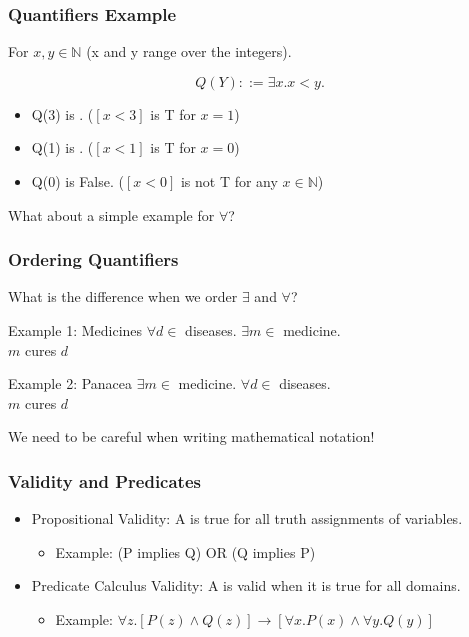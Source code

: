 \documentclass{beamer}
\begin{document}
\begin{frame}
  \frametitle{Quantifiers Example}

  For $x,y \in \mathbb{N}$ (x and y range over the integers).

  \begin{equation*}
    Q(Y) ::= \exists x. x < y.
  \end{equation*}

  \begin{itemize}
  \item Q(3) is . ($[x < 3]$ is T for $x = 1$)
  \item Q(1) is . ($[x < 1]$ is T for $x = 0$)
  \item Q(0) is \alert{False}. ($[x < 0]$ is not T for any $x\in\mathbb{N}$)
  \end{itemize}

  \bigskip

  What about a simple example for $\forall$?
\end{frame}

\begin{frame}
  \frametitle{Ordering Quantifiers}
  What is the difference when we order $\exists$ and $\forall$?

  \bigskip
  
  \begin{block}{Example 1: Medicines}
    $\forall d \in$ diseases. $\exists m \in$ medicine.\\
    $m$ cures $d$
  \end{block}

  \begin{block}{Example 2: Panacea}
    $\exists m \in$ medicine. $\forall d \in$ diseases.\\
    $m$ cures $d$
  \end{block}

  We need to be careful when writing mathematical notation!
  
\end{frame}

\begin{frame}
  \frametitle{Validity and Predicates}
  \begin{itemize}
  \item Propositional Validity: A  is true for
    all truth assignments of variables.
    \begin{itemize}
    \item Example: (P implies Q) OR (Q implies P)
    \end{itemize}

    \bigskip
    
  \item Predicate Calculus Validity: A  is valid
    when it is true for all domains.
    \begin{itemize}
    \item Example: $\forall z. [P(z) \land Q(z)] \rightarrow [\forall x.P(x) \land \forall y.Q(y)]$
    \end{itemize}
  \end{itemize}

  
\end{frame}
\end{document}
